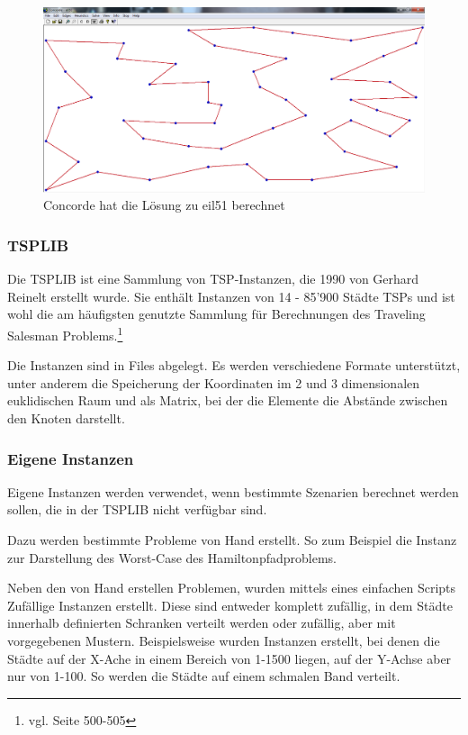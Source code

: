 \documentclass[11pt,a4paper]{article}
\begin{document}
\begin{figure}[H]
        \centering
        \includegraphics[width=14cm]{gfx/concorde_solution}
        \caption{Concorde hat die Lösung zu eil51 berechnet}
        \label{img:concorde_solution}
\end{figure}

\subsubsection{TSPLIB}
Die TSPLIB ist eine Sammlung von TSP-Instanzen, die 1990 von Gerhard Reinelt erstellt wurde. Sie enthält Instanzen von 14 - 85'900 Städte TSPs und ist wohl die am häufigsten genutzte Sammlung für Berechnungen des Traveling Salesman Problems.\footnote{vgl. \cite{applegate06} Seite 500-505}

Die Instanzen sind in Files abgelegt. Es werden verschiedene Formate unterstützt, unter anderem die Speicherung der Koordinaten im 2 und 3 dimensionalen euklidischen Raum und als Matrix, bei der die Elemente die Abstände zwischen den Knoten darstellt.

\subsubsection{Eigene Instanzen}
Eigene Instanzen werden verwendet, wenn bestimmte Szenarien berechnet werden sollen, die in der TSPLIB nicht verfügbar sind.

Dazu werden bestimmte Probleme von Hand erstellt. So zum Beispiel die Instanz zur Darstellung des Worst-Case des Hamiltonpfadproblems.

Neben den von Hand erstellen Problemen, wurden mittels eines einfachen Scripts Zufällige Instanzen erstellt. Diese sind entweder komplett zufällig, in dem Städte innerhalb definierten Schranken verteilt werden oder zufällig, aber mit vorgegebenen Mustern. Beispielsweise wurden Instanzen erstellt, bei denen die Städte auf der X-Ache in einem Bereich von 1-1500 liegen, auf der Y-Achse aber nur von 1-100. So werden die Städte auf einem schmalen Band verteilt.
\end{document}
